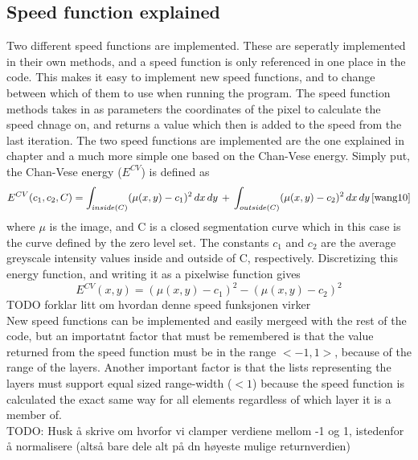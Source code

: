 \subsection{Speed function explained}
Two different speed functions are implemented. These are seperatly implemented in their own methods, and a speed function is only referenced in one place in the code. This makes it easy to implement new speed functions, and to change between which of them to use when running the program. The speed function methods takes in as parameters the coordinates of the pixel to calculate the speed chnage on, and returns a value which then is added to the speed from the last iteration. The two speed functions are implemented are the one explained in chapter \label{levelSetChap} and a much more simple one based on the Chan-Vese energy. Simply put, the Chan-Vese energy ($E^{CV}$) is defined as 
\begin{equation}
E^{CV}(c_1,c_2,C) = \int_{inside(C)} (\mu (x,y) - c_1)^2 \, dx \, dy \, + \, \int_{outside(C)} (\mu (x,y) - c_2)^2 \, dx \, dy \, \cite{wang10} %
\end{equation}
where $\mu$ is the image, and C is a closed segmentation curve which in this case is the curve defined by the zero level set. The constants $c_1$ and $c_2$ are the average greyscale intensity values inside and outside of C, respectively. Discretizing this energy function, and writing it as a pixelwise function gives
\begin{equation}
E^{CV}(x,y) = (\mu (x,y) - c_1)^2 - (\mu (x,y) - c_2)^2
\end{equation}
TODO forklar litt om hvordan denne speed funksjonen virker\\
New speed functions can be implemented and easily mergeed with the rest of the code, but an importatnt factor that must be remembered is that the value returned from the speed function must be in the range $<-1,1>$, because of the range of the layers. Another important factor is that the lists representing the layers must support equal sized range-width ($<1$) because the speed function is calculated the exact same way for all elements regardless of which layer it is a member of. \\
TODO: Husk å skrive om hvorfor vi clamper verdiene mellom -1 og 1, istedenfor å normalisere (altså bare dele alt på dn høyeste mulige returnverdien)

